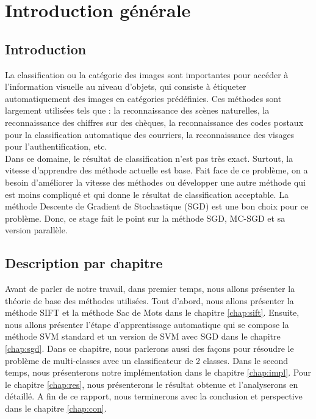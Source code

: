 \chapter{Introduction générale}

\section{Introduction}

La classification ou la catégorie des images sont importantes pour accéder à l'information visuelle au niveau d'objets, qui consiste à étiqueter automatiquement des images en catégories prédéfinies. Ces méthodes sont largement utilisées tels que : la reconnaissance des scènes naturelles, la reconnaissance des chiffres sur des chèques, la reconnaissance des codes postaux pour la classification automatique des courriers, la reconnaissance des visages pour l'authentification, etc.\\

Dans ce domaine, le résultat de classification n'est pas très exact. Surtout, la vitesse d'apprendre des méthode actuelle est base. Fait face de ce problème, on a besoin d'améliorer la vitesse des méthodes ou développer une autre méthode qui est moins compliqué et qui donne le résultat de classification acceptable. La méthode Descente de Gradient de Stochastique (SGD) est une bon choix pour ce problème. Donc, ce stage fait le point sur la méthode SGD, MC-SGD et sa version parallèle.

\section{Description par chapitre}

Avant de parler de notre travail, dans premier temps, nous allons présenter la théorie de base des méthodes utilisées. Tout d'abord, nous allons présenter la méthode SIFT et la méthode Sac de Mots dans le chapitre \ref{chap:sift}. Ensuite, nous allons présenter l'étape d'apprentissage automatique qui se compose la méthode SVM standard et un version de SVM avec SGD dans le chapitre \ref{chap:sgd}. Dans ce chapitre, nous parlerons aussi des façons pour résoudre le problème de multi-classes avec un classificateur de 2 classes. Dans le second temps, nous présenterons notre implémentation dans le chapitre \ref{chap:impl}. Pour le chapitre \ref{chap:res}, nous présenterons le résultat obtenue et l'analyserons en détaillé. A fin de ce rapport, nous terminerons avec la conclusion et perspective dans le chapitre \ref{chap:con}.